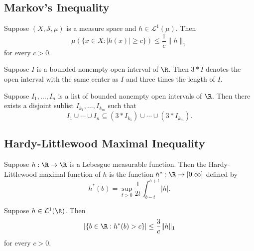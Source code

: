 \subsection{Markov's Inequality}

\begin{prop}
   Suppose \( (X,\mathcal{S}, \mu) \) is a measure space and \( h \in \mathcal{L}^{1}(\mu) \). Then 
   \[  \mu(\{ x \in X : | h(x) |  \geq c  \} ) \leq \frac{ 1 }{ c }  \|h\|_1 \]
   for every \( c  >0  \).
\end{prop}

\begin{definition}
   Suppose \( I  \) is a bounded nonempty open interval of \( \R  \). Then \( 3 * I  \) denotes the open interval with the same center as \( I  \) and three times the length of \( I  \).  
\end{definition}

\begin{lemma}
   Suppose \( {I}_{1}, \dots, {I}_{n}  \) is a list of bounded nonempty open intervals of \( \R  \). Then there exists a disjoint sublist \(  {I}_{{k}_{1}} , \dots, {I}_{{k}_{m}} \) such that  
   \[ {I}_{1} \cup \cdots \cup {I}_{n} \subseteq  (3 * {I}_{{k}_{1}}) \cup \cdots \cup (3 * {I}_{{k}_{m}}).\]
\end{lemma}

\subsection{Hardy-Littlewood Maximal Inequality}

\begin{definition}
    Suppose \( h : \R \to \R  \) is a Lebesgue measurable function. Then the Hardy-Littlewood maximal function of \( h  \) is the function \( h^{*} : \R \to [0.\infty ] \) defined by
    \[  h^{*}(b) = \sup_{t > 0} \frac{ 1 }{ 2t }  \int_{ b-t }^{ b + t } | h |.   \]
\end{definition}

\begin{prop}
   Suppose \( h \in \mathcal{L}^{1}(\R) \). Then  
   \[  | \{ b \in \R : h^{*}(b) > c \}  | \leq \frac{ 3 }{ c }  \|h\|_1 \]
   for every \( c >  0  \).
\end{prop}





